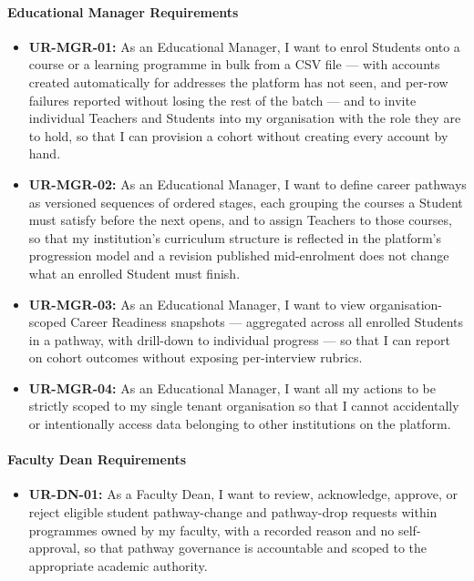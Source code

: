 \paragraph{Educational Manager Requirements}
\begin{itemize}
    \item \textbf{UR-MGR-01:} As an Educational Manager, I want to enrol Students onto a course or a learning programme in bulk from a CSV file --- with accounts created automatically for addresses the platform has not seen, and per-row failures reported without losing the rest of the batch --- and to invite individual Teachers and Students into my organisation with the role they are to hold, so that I can provision a cohort without creating every account by hand.
    \item \textbf{UR-MGR-02:} As an Educational Manager, I want to define career pathways as versioned sequences of ordered stages, each grouping the courses a Student must satisfy before the next opens, and to assign Teachers to those courses, so that my institution's curriculum structure is reflected in the platform's progression model and a revision published mid-enrolment does not change what an enrolled Student must finish.
    \item \textbf{UR-MGR-03:} As an Educational Manager, I want to view organisation-scoped Career Readiness snapshots --- aggregated across all enrolled Students in a pathway, with drill-down to individual progress --- so that I can report on cohort outcomes without exposing per-interview rubrics.
    \item \textbf{UR-MGR-04:} As an Educational Manager, I want all my actions to be strictly scoped to my single tenant organisation so that I cannot accidentally or intentionally access data belonging to other institutions on the platform.
\end{itemize}

\paragraph{Faculty Dean Requirements}
\begin{itemize}
    \item \textbf{UR-DN-01:} As a Faculty Dean, I want to review, acknowledge, approve, or reject eligible student pathway-change and pathway-drop requests within programmes owned by my faculty, with a recorded reason and no self-approval, so that pathway governance is accountable and scoped to the appropriate academic authority.
\end{itemize}

